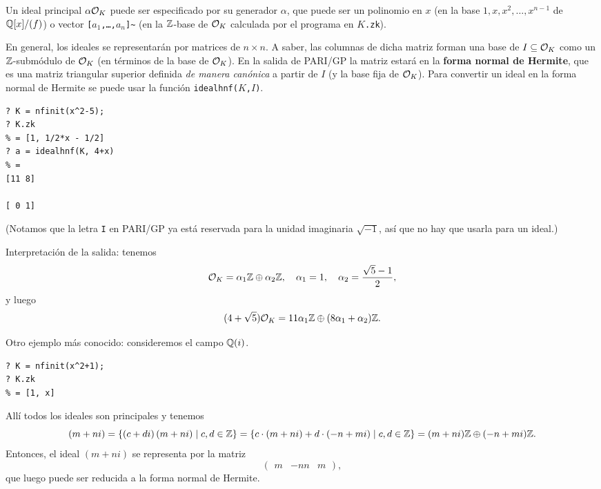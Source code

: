 Un ideal principal $\alpha \mathcal{O}_K$ puede ser especificado por su generador
$\alpha$, que puede ser un polinomio en $x$ (en la base $1,x,x^2,\ldots,x^{n-1}$
de $\mathbb{Q}[x]/(f)$) o vector \texttt{[$a_1$,\ldots,$a_n$]\textasciitilde} (en la
$\mathbb{Z}$-base de $\mathcal{O}_K$ calculada por el programa en \texttt{$K$.zk}).

En general, los ideales se representarán por matrices de $n\times n$. A saber,
las columnas de dicha matriz forman una base de $I \subseteq \mathcal{O}_K$ como un
$\mathbb{Z}$-submódulo de $\mathcal{O}_K$ (en términos de la base de $\mathcal{O}_K$). En la salida de
PARI/GP la matriz estará en la \textbf{forma normal de Hermite}, que es una
matriz triangular superior definida \emph{de manera canónica} a partir de
$I$ (y la base fija de $\mathcal{O}_K$). Para convertir un ideal en la forma normal de
Hermite se puede usar la función \texttt{idealhnf($K$,$I$)}.

\begin{shaded}
\begin{verbatim}
? K = nfinit(x^2-5);
? K.zk
% = [1, 1/2*x - 1/2]
? a = idealhnf(K, 4+x)
% =
[11 8]

[ 0 1]
\end{verbatim}
\end{shaded}

(Notamos que la letra \texttt{I} en PARI/GP ya está reservada para la unidad
imaginaria $\sqrt{-1}$, así que no hay que usarla para un ideal.)

Interpretación de la salida: tenemos
\[ \mathcal{O}_K = \alpha_1\mathbb{Z} \oplus \alpha_2\mathbb{Z}, \quad
   \alpha_1 = 1, \quad
   \alpha_2 = \frac{\sqrt{5} - 1}{2}, \]
y luego
$$(4 + \sqrt{5})\mathcal{O}_K = 11\alpha_1\mathbb{Z} \oplus (8\alpha_1 + \alpha_2)\mathbb{Z}.$$

Otro ejemplo más conocido: consideremos el campo $\mathbb{Q}(i)$.

\begin{shaded}
\begin{verbatim}
? K = nfinit(x^2+1);
? K.zk
% = [1, x]
\end{verbatim}
\end{shaded}

Allí todos los ideales son principales y tenemos
\[ (m+ni) = \{(c + di)\,(m + ni) \mid c, d \in \mathbb{Z} \} =
   \{ c \cdot (m + ni) + d \cdot (-n + mi) \mid c, d \in \mathbb{Z} \} =
   (m + ni) \mathbb{Z} \oplus (-n + mi) \mathbb{Z}. \]
Entonces, el ideal $(m + ni)$ se representa por la matriz
\[ \begin{pmatrix}
  m & -n
  n & m
\end{pmatrix}, \]
que luego puede ser reducida a la forma normal de Hermite.

